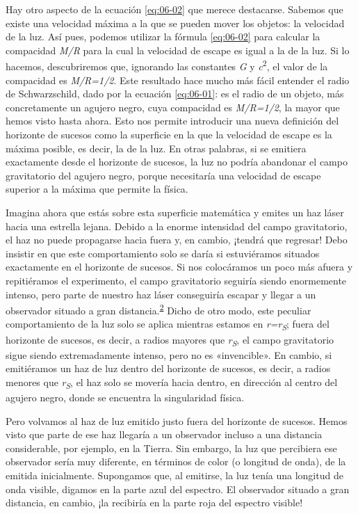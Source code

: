 Hay otro aspecto de la ecuación \eqref{eq:06-02} que merece destacarse. Sabemos que existe una velocidad máxima a la que se pueden mover los objetos: la velocidad de la luz. Así pues, podemos utilizar la fórmula \eqref{eq:06-02} para calcular la compacidad \emph{M/R} para la cual la velocidad de escape es igual a la de la luz. Si lo hacemos, descubriremos que, ignorando las constantes \emph{G} y \emph{c}\textsuperscript{2}, el valor de la compacidad es \emph{M/R=1/2}. Este resultado hace mucho más fácil entender el radio de Schwarzschild, dado por la ecuación \eqref{eq:06-01}: es el radio de un objeto, más concretamente un agujero negro, cuya compacidad es \emph{M/R=1/2}, la mayor que hemos visto hasta ahora. Esto nos permite introducir una nueva definición del horizonte de sucesos como la superficie en la que la velocidad de escape es la máxima posible, es decir, la de la luz. En otras palabras, si se emitiera exactamente desde el horizonte de sucesos, la luz no podría abandonar el campo gravitatorio del agujero negro, porque necesitaría una velocidad de escape superior a la máxima que permite la física.

Imagina ahora que estás sobre esta superficie matemática y emites un haz láser hacia una estrella lejana. Debido a la enorme intensidad del campo gravitatorio, el haz no puede propagarse hacia fuera y, en cambio, ¡tendrá que regresar! Debo insistir en que este comportamiento solo se daría si estuviéramos situados exactamente en el horizonte de sucesos. Si nos colocáramos un poco más afuera y repitiéramos el experimento, el campo gravitatorio seguiría siendo enormemente intenso, pero parte de nuestro haz láser conseguiría escapar y llegar a un observador situado a gran distancia.\textsuperscript{\hyperlink{note:06-02}{2}} Dicho de otro modo, este peculiar comportamiento de la luz solo se aplica mientras estamos en \emph{r=r\textsubscript{S}}; fuera del horizonte de sucesos, es decir, a radios mayores que \emph{r\textsubscript{S}}, el campo gravitatorio sigue siendo extremadamente intenso, pero no es «invencible». En cambio, si emitiéramos un haz de luz dentro del horizonte de sucesos, es decir, a radios menores que \emph{r\textsubscript{S}}, el haz solo se movería hacia dentro, en dirección al centro del agujero negro, donde se encuentra la singularidad física.

Pero volvamos al haz de luz emitido justo fuera del horizonte de sucesos. Hemos visto que parte de ese haz llegaría a un observador incluso a una distancia considerable, por ejemplo, en la Tierra. Sin embargo, la luz que percibiera ese observador sería muy diferente, en términos de color (o longitud de onda), de la emitida inicialmente. Supongamos que, al emitirse, la luz tenía una longitud de onda visible, digamos en la parte azul del espectro. El observador situado a gran distancia, en cambio, ¡la recibiría en la parte roja del espectro visible!

